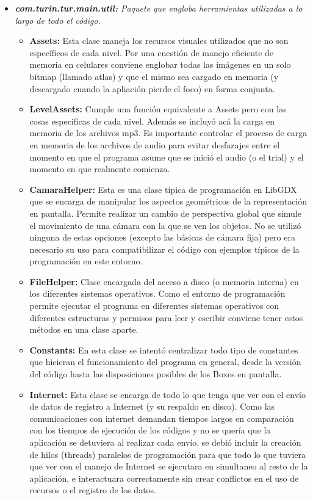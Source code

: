 \documentclass{article}
\numberwithin{figure}{section}
\begin{document}
\begin{itemize}
        \item \textit{\textbf{com.turin.tur.main.util:} Paquete que engloba herramientas utilizadas a lo largo de todo el código.}
        \begin{itemize}
            \item \textbf{Assets:} Esta clase maneja los recursos visuales utilizados que no son específicos de cada nivel. Por una cuestión de manejo eficiente de memoria en celulares conviene englobar todas las imágenes en un solo bitmap (llamado atlas) y que el mismo sea cargado en memoria (y descargado cuando la apliación pierde el foco) en forma conjunta.
            \item \textbf{LevelAssets:} Cumple una función equivalente a Assets pero con las cosas especificas de cada nivel. Además se incluyó acá la carga en memoria de los archivos mp3. Es importante controlar el proceso de carga en memoria de los archivos de audio para evitar desfazajes entre el momento en que el programa asume que se inició el audio (o el trial) y el momento en que realmente comienza.
            \item \textbf{CamaraHelper:} Esta es una clase típica de programación en LibGDX que se encarga de manipular los aspectos geométricos de la representación en pantalla. Permite realizar un cambio de perspectiva global que simule el movimiento de una cámara con la que se ven los objetos. No se utilizó ninguna de estas opciones (excepto las básicas de cámara fija) pero era necesario su uso para compatibilizar el código con ejemplos típicos de la programación en este entorno.
            \item \textbf{FileHelper:} Clase encargada del acceso a disco (o memoria interna) en los diferentes sistemas operativos. Como el entorno de programación permite ejecutar el programa en diferentes sistemas operativos con diferentes estructuras y permisos para leer y escribir conviene tener estos métodos en una clase aparte. 
            \item \textbf{Constants:} En esta clase se intentó centralizar todo tipo de constantes que hicieran el funcionamiento del programa en general, desde la versión del código hasta las disposiciones posibles de los Boxes en pantalla. 
            \item \textbf{Internet:} Esta clase se encarga de todo lo que tenga que ver con el envío de datos de registro a Internet (y su respaldo en disco). Como las comunicaciones con internet demandan tiempos largos en comparación con los tiempos de ejecución de los códigos y no se  quería que la aplicación se detuviera al realizar cada envío, se debió incluir la creación de hilos (threads) paralelos de programación para que todo lo que tuviera que ver con el manejo de Internet se ejecutara en simultaneo al resto de la aplicación, e interactuara correctamente sin crear conflictos en el uso de recursos o el registro de los datos.
        \end{itemize}
        

\end{itemize}
\end{document}
